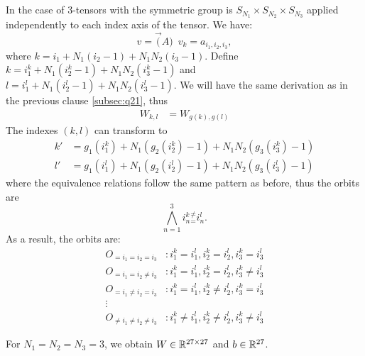 \documentclass[english]{article}
\begin{document}
\subsection{~}

In the case of 3-tensors with the symmetric group is $S_{N_1}\times S_{N_2}\times S_{N_3}$
applied independently to each index axis of the tensor. We have: 
\begin{equation}
v=\vec(A) \,\,\,   v_k=a_{i_1,i_2,i_3}
,
\end{equation}
where $k=i_1+N_1(i_2-1)+N_1N_2(i_3-1)$. Define $k=i_1^{k}+N_1(i_2^{k}-1)+N_1N_2(i_3^{k}-1)$
and $l=i_1^{l}+N_1(i_2^{l}-1)+N_1N_2(i_3^{l}-1)$. We will
have the same derivation as in the previous clause \ref{subsec:q21},
thus 
\begin{align*}
W_{k,l} & =W_{g(k),g(l)}
\end{align*}
The indexes $\left(k,l\right)$ can transform to 
\begin{align*}
k' & =g_1(i_1^{k})+N_1(g_2(i_2^{k})-1)+N_1N_2(g_3(i_3^{k})-1)\\
l' & =g_1(i_1^{l})+N_1(g_2(i_2^{l})-1)+N_1N_2(g_3(i_3^{l})-1)
\end{align*}
where the equivalence relations follow the same pattern as before,
thus the orbits are 
\begin{equation}
\bigwedge_{n=1}^{3} i_n^{k}{}_{=}^{\neq}i_n^{l}
.    
\end{equation}
As a result, the orbits are:
\begin{align*}
O_{=i_1=i_2=i_3} & :i_1^{k}=i_1^{l},i_2^{k}=i_2^{l},i_3^{k}=i_3^{l}\\
O_{=i_1=i_2\neq i_3} & :i_1^{k}=i_1^{l},i_2^{k}=i_2^{l},i_3^{k}\neq i_3^{l}\\
O_{=i_1\neq i_2=i_3} & :i_1^{k}=i_1^{l},i_2^{k}\neq i_2^{l},i_3^{k}=i_3^{l}\\
\vdots &\\
O_{\neq i_1 \neq i_2\neq i_3} & :i_1^{k}\neq i_1^{l},i_2^{k}\neq i_2^{l},i_3^{k}\neq i_3^{l}
\end{align*}

For $N_1=N_2=N_3=3$, we obtain $W\in\mathbb{R}^{27\times27}$ and $b\in\mathbb{R}^{27}$.
\end{document}
